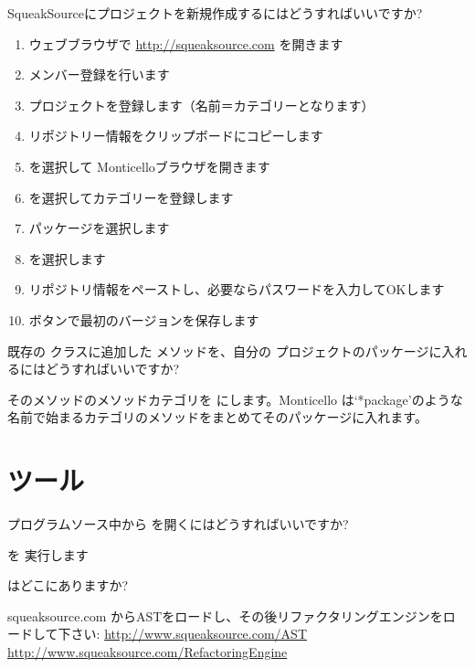 \documentclass[a4paper,10pt,twoside]{book}
\begin{document}
\begin{faq}
SqueakSourceにプロジェクトを新規作成するにはどうすればいいですか?
\end{faq}
\answer
\begin{enumerate}
  \item ウェブブラウザで \url{http://squeaksource.com} を開きます
  \item メンバー登録を行います
  \item プロジェクトを登録します（名前＝カテゴリーとなります）
  \item リポジトリー情報をクリップボードにコピーします
  \item {} を選択して Monticelloブラウザを開きます
  \item {} を選択してカテゴリーを登録します
  \item パッケージを選択します
  \item {} を選択します
  \item リポジトリ情報をペーストし、必要ならパスワードを入力してOKします
  \item {}ボタンで最初のバージョンを保存します
\end{enumerate}

\begin{faq}
既存の  クラスに追加した  メソッドを、自分の  プロジェクトのパッケージに入れるにはどうすればいいですか?
\end{faq}
\answer
そのメソッドのメソッドカテゴリを  にします。Monticello は‘*package’のような名前で始まるカテゴリのメソッドをまとめてそのパッケージに入れます。

\section{ツール}

\begin{faq}
プログラムソース中から   を開くにはどうすればいいですか?
\end{faq}
\answer
  を 実行します

\begin{faq}
 はどこにありますか? 
\end{faq}
\answer
squeaksource.com からASTをロードし、その後リファクタリングエンジンをロードして下さい:
\url{http://www.squeaksource.com/AST}
\url{http://www.squeaksource.com/RefactoringEngine}
\end{document}
